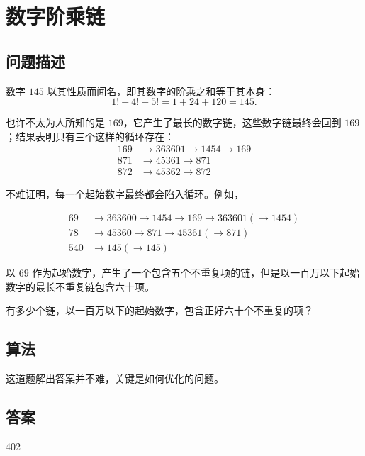 \section{数字阶乘链}
\subsection{问题描述}
\begin{tcolorbox}

	数字 $145$ 以其性质而闻名，即其数字的阶乘之和等于其本身：
	\[1! + 4! + 5! = 1 + 24 + 120 = 145.\]

	也许不太为人所知的是 $169$，它产生了最长的数字链，这些数字链最终会回到 $169$；结果表明只有三个这样的循环存在：
	\begin{align*}
		169 & \rightarrow 363601 \rightarrow 1454 \rightarrow 169 \\
		871 & \rightarrow 45361 \rightarrow 871                   \\
		872 & \rightarrow 45362 \rightarrow 872
	\end{align*}

	不难证明，每一个起始数字最终都会陷入循环。例如，

	\begin{align*}
		69  & \rightarrow 363600 \rightarrow 1454 \rightarrow 169 \rightarrow 363601 (\rightarrow 1454) \\
		78  & \rightarrow 45360 \rightarrow 871 \rightarrow 45361 (\rightarrow 871)                     \\
		540 & \rightarrow 145 (\rightarrow 145)
	\end{align*}

	以 $69$ 作为起始数字，产生了一个包含五个不重复项的链，但是以一百万以下起始数字的最长不重复链包含六十项。

	有多少个链，以一百万以下的起始数字，包含正好六十个不重复的项？
\end{tcolorbox}

\subsection{算法}
这道题解出答案并不难，关键是如何优化的问题。

\subsection{答案}
402
